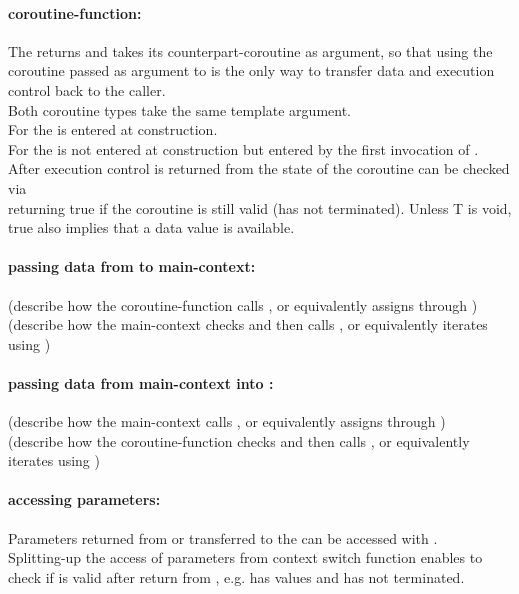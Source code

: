 \paragraph*{coroutine-function:}
The \corofunction returns  and takes its counterpart-coroutine as
argument, so that using the coroutine passed as argument to \corofunction is the
only way to transfer data and execution control back to the caller.\\
Both coroutine types take the same template argument.\\
For \pullcoro the \corofunction is entered at \pullcoro construction.\\
For \pushcoro the \corofunction is not entered at \pushcoro construction but
entered by the first invocation of \pushcoroop.\\
After execution control is returned from \corofunction the state of the
coroutine can be checked via\\
\pullcorobool returning true if the coroutine is still valid (\corofunction has
not terminated). Unless T is void, true also implies that a data value is
available.

\paragraph*{passing data from \pullcoro to main-context:}
(describe how the coroutine-function calls \pushcoroop, or equivalently
assigns through \pushcoroiterator)\\
(describe how the main-context checks \pullcorobool and then calls
\pullcoroget, or equivalently iterates using \pullcoroiterator)

\paragraph*{passing data from main-context into \pushcoro:}
(describe how the main-context calls \pushcoroop, or equivalently
assigns through \pullcoroiterator)\\
(describe how the coroutine-function checks \pullcorobool and then calls
\pullcoroget, or equivalently iterates using \pullcoroiterator)

\paragraph*{accessing parameters:}
Parameters returned from or transferred to the \corofunction can be accessed
with \pullcoroget.\\
\newline
Splitting-up the access of parameters from context switch function enables to
check if \pullcoro is valid after return from \pullcoroop, e.g. \pullcoro has
values and \corofunction has not terminated.

